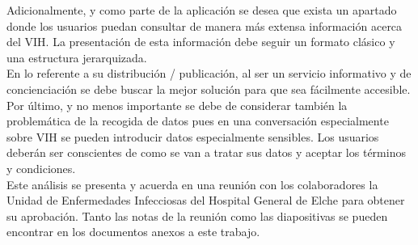 Adicionalmente, y como parte de la aplicación se desea que exista un apartado donde los usuarios puedan consultar de manera más extensa información acerca del VIH. La presentación de esta información debe seguir un formato clásico y una estructura jerarquizada.\\

En lo referente a su distribución / publicación, al ser un servicio informativo y de concienciación se debe buscar la mejor solución para que sea fácilmente accesible. Por último, y no menos importante se debe de considerar también la problemática de la recogida de datos pues en una conversación especialmente sobre VIH se pueden introducir datos especialmente sensibles. Los usuarios deberán ser conscientes de como se van a tratar sus datos y aceptar los términos y condiciones.\\


Este análisis se presenta y acuerda en una reunión con los colaboradores la Unidad de Enfermedades Infecciosas del Hospital General de Elche para obtener su aprobación. Tanto las notas de la reunión como las diapositivas se pueden encontrar en los documentos anexos a este trabajo.\\

